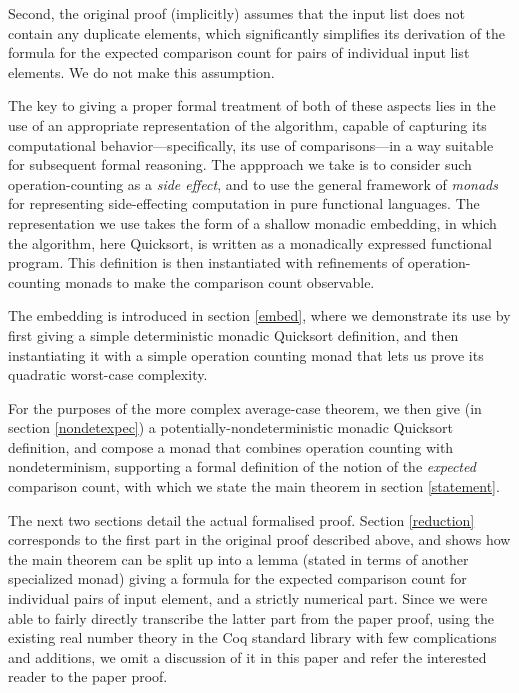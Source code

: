 \documentclass[runningheads]{llncs}
\begin{document}
Second, the original proof (implicitly) assumes that the input list does not contain any duplicate elements, which significantly simplifies its derivation of the formula for the expected comparison count for pairs of individual input list elements. We do not make this assumption.

The key to giving a proper formal treatment of both of these aspects lies in the use of an appropriate representation of the algorithm, capable of capturing its computational behavior---specifically, its use of comparisons---in a way suitable for subsequent formal reasoning. 
The appproach we take is to consider such operation-counting as a \emph{side effect}, and to use the general framework of \emph{monads} for representing side-effecting computation in pure functional languages. 
The representation we use takes the form of a shallow monadic embedding, in which the algorithm, here Quicksort, is written as a monadically expressed functional program. This definition is then instantiated with refinements of operation-counting monads to make the comparison count observable.

The embedding is introduced in section \ref{embed}, where we demonstrate its use by first giving a simple deterministic monadic Quicksort definition, and then instantiating it with a simple operation counting monad that lets us prove its quadratic worst-case complexity.

For the purposes of the more complex average-case theorem, we then give (in section \ref{nondetexpec}) a potentially-nondeterministic monadic Quicksort definition, and compose a monad that combines operation counting with nondeterminism, supporting a formal definition of the notion of the \emph{expected} comparison count, with which we state the main theorem in section \ref{statement}.

The next two sections detail the actual formalised proof. Section \ref{reduction} corresponds to the first part in the original proof described above, and shows how the main theorem can be split up into a lemma (stated in terms of another specialized monad) giving a formula for the expected comparison count for individual pairs of input element, and a strictly numerical part. Since we were able to fairly directly transcribe the latter part from the paper proof, using the existing real number theory in the Coq standard library with few complications and additions, we omit a discussion of it in this paper and refer the interested reader to the paper proof.
\end{document}
